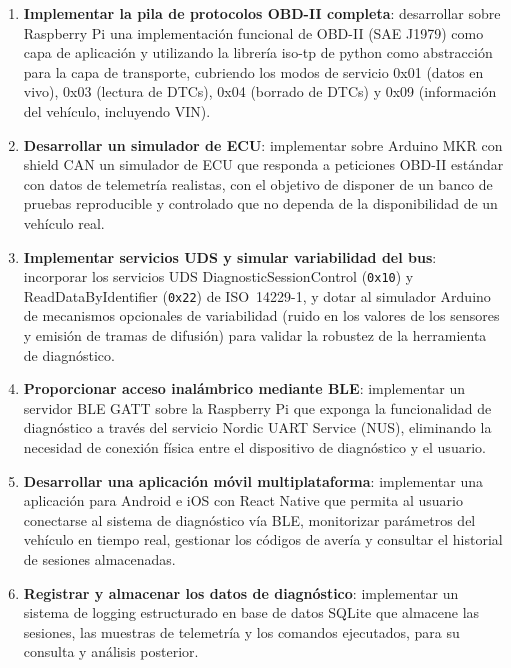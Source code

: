 \begin{enumerate}
    \item[\textbf{O1.}] \textbf{Implementar la pila de protocolos OBD-II completa}: desarrollar sobre Raspberry Pi una implementación funcional de OBD-II (SAE J1979) como capa de aplicación y utilizando la librería iso-tp de python como abstracción para la capa de transporte, cubriendo los modos de servicio 0x01 (datos en vivo), 0x03 (lectura de DTCs), 0x04 (borrado de DTCs) y 0x09 (información del vehículo, incluyendo VIN).

    \item[\textbf{O2.}] \textbf{Desarrollar un simulador de ECU}: implementar sobre Arduino MKR con shield CAN un simulador de ECU que responda a peticiones OBD-II estándar con datos de telemetría realistas, con el objetivo de disponer de un banco de pruebas reproducible y controlado que no dependa de la disponibilidad de un vehículo real.

    \item[\textbf{O3.}] \textbf{Implementar servicios UDS y simular variabilidad del bus}: incorporar los servicios UDS DiagnosticSessionControl (\texttt{0x10}) y ReadDataByIdentifier (\texttt{0x22}) de ISO~14229-1, y dotar al simulador Arduino de mecanismos opcionales de variabilidad (ruido en los valores de los sensores y emisión de tramas de difusión) para validar la robustez de la herramienta de diagnóstico.

    \item[\textbf{O4.}] \textbf{Proporcionar acceso inalámbrico mediante BLE}: implementar un servidor BLE GATT sobre la Raspberry Pi que exponga la funcionalidad de diagnóstico a través del servicio Nordic UART Service (NUS), eliminando la necesidad de conexión física entre el dispositivo de diagnóstico y el usuario.

    \item[\textbf{O5.}] \textbf{Desarrollar una aplicación móvil multiplataforma}: implementar una aplicación para Android e iOS con React Native que permita al usuario conectarse al sistema de diagnóstico vía BLE, monitorizar parámetros del vehículo en tiempo real, gestionar los códigos de avería y consultar el historial de sesiones almacenadas.

    \item[\textbf{O6.}] \textbf{Registrar y almacenar los datos de diagnóstico}: implementar un sistema de logging estructurado en base de datos SQLite que almacene las sesiones, las muestras de telemetría y los comandos ejecutados, para su consulta y análisis posterior.
\end{enumerate}

